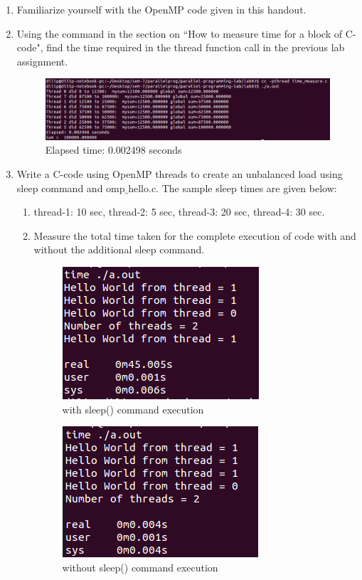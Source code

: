 \documentclass{sem5}
\author{Dilip Puri}
\begin{document}
\begin{enumerate}
\item Familiarize yourself with the OpenMP code given in this handout.
\item Using the command in the section on ``How to measure time for a block of C-code", find the time required in the thread function call in the previous lab assignment.\\
\begin{figure}[!htp]
\centering
\includegraphics[scale=.4]{../2.png}
\caption{Elapsed time: 0.002498 seconds}
\end{figure}
\item Write a C-code using OpenMP threads to create an unbalanced load using sleep command and omp$\_$hello.c. The sample sleep times are given below:
\begin{enumerate}
\item thread-1: 10 sec, thread-2: 5 sec, thread-3: 20 sec, thread-4: 30 sec.
\item Measure the total time taken for the complete execution of code with and without the additional sleep command.\\
\begin{figure}[!htp]
\centering
\includegraphics[scale=.6]{../31.png}
\caption{with sleep() command execution}
\end{figure}

\begin{figure}[!htp]
\centering
\includegraphics[scale=.6]{../32.png}
\caption{without sleep() command execution}
\end{figure}
\end{enumerate}


\end{enumerate}
\end{document}
